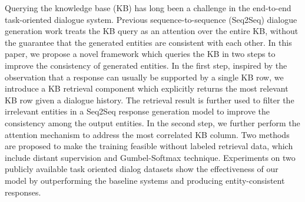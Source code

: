 Querying the knowledge base (KB) has long been a challenge in the end-to-end task-oriented dialogue system.
Previous sequence-to-sequence (Seq2Seq) dialogue generation work treats the KB query as an attention over the entire KB,
without the guarantee that the generated entities are consistent with each other.
In this paper, we propose a novel framework which queries the KB in two steps to improve the consistency of generated entities. In the first step, inspired by the observation that a response can usually be supported by a single KB row,
we introduce a KB retrieval component which explicitly returns the most relevant KB row given a dialogue history.
The retrieval result is further used to filter the irrelevant entities in a Seq2Seq response generation model
to improve the consistency among the output entities. In the second step, we further perform the attention mechanism to address the most correlated KB column. Two methods are proposed to make the training feasible without labeled retrieval data, which include distant supervision and Gumbel-Softmax technique. Experiments on two publicly available task oriented dialog datasets show the effectiveness of our model by outperforming the baseline systems and producing entity-consistent responses.
